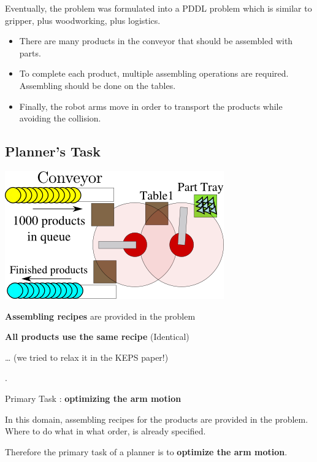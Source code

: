 \begin{resume}
Eventually, the problem was formulated into a PDDL problem
which is similar to gripper, plus woodworking, plus logistics.

\begin{itemize}
\item There are many products in the conveyor that should be assembled with parts.
\item To complete each product, multiple assembling operations are required.
Assembling should be done on the tables.
\item Finally, the robot arms move in order to transport the products
while avoiding the collision.
\end{itemize}
\end{resume}

\subsection{Planner's Task}
\label{sec-2-1}

\includegraphics[width=.6\textwidth]{img/model2a.png}

\textbf{Assembling recipes} are provided in the problem

\textbf{All products use the same recipe} (Identical)

\begin{alignright}
\ldots{} (we tried to relax it in the KEPS paper!)
\end{alignright}

.

\begin{center}
Primary Task : \textbf{optimizing the arm motion}
\end{center}

\begin{resume}
In this domain, assembling recipes for the products are provided in the problem.
Where to do what in what order, is already specified.

Therefore the primary task of a planner is to \textbf{optimize the arm motion}.
\end{resume}

